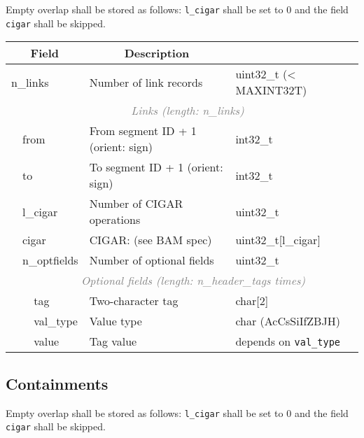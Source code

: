 \documentclass[12pt]{article}
\begin{document}
Empty overlap shall be stored as follows: \texttt{l\_cigar} shall be set
to 0 and the field \texttt{cigar} shall be skipped.
\vspace{0.5cm}

\begin{tabular}{|ll|>{\sffamily}l|p{6.5cm}|>{\ttfamily}l|}
\hline
\multicolumn{3}{|c|}{\textbf{Field}} &
\multicolumn{1}{c|}{\textbf{Description}} &
\multicolumn{1}{c|}{\textbf{Type}} \\
\hline
\multicolumn{3}{|l|}{\sf n\_links}
& Number of link records & uint32\_t (< MAXINT32T) \\
\hline
\multicolumn{1}{|l}{} &
\multicolumn{4}{c|}{\textcolor{gray}{\textit{Links (length: n\_links)}}}\\
\cline{2-5}
& \multicolumn{2}{|l|}{\sf from} & From segment ID + 1 (orient: sign) & int32\_t \\
\cline{2-5}
& \multicolumn{2}{|l|}{\sf to} & To segment ID + 1 (orient: sign) & int32\_t \\
\cline{2-5}
& \multicolumn{2}{|l|}{\sf l\_cigar} &
Number of CIGAR operations & uint32\_t \\
\cline{2-5}
& \multicolumn{2}{|l|}{\sf cigar} &
CIGAR: (see BAM spec) & uint32\_t[l\_cigar] \\
\cline{2-5}
& \multicolumn{2}{|l|}{\sf n\_optfields}
  & Number of optional fields & uint32\_t \\
\cline{2-5}
\multicolumn{2}{|l}{} &
\multicolumn{3}{c|}{\textcolor{gray}{\textit{Optional fields
(length: n\_header\_tags times)}}}\\
\cline{3-5}
& & tag & Two-character tag & char[2] \\
\cline{3-5}
& & val\_type & Value type & char (AcCsSiIfZBJH) \\
\cline{3-5}
& & value & Tag value &
depends on {\tt val\_type} \\
\hline
\end{tabular}

\newpage

\subsection*{Containments}

Empty overlap shall be stored as follows: \texttt{l\_cigar} shall be set
to 0 and the field \texttt{cigar} shall be skipped.
\vspace{0.5cm}
\end{document}
